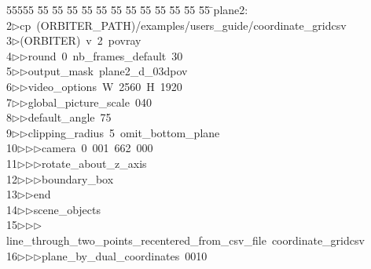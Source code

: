 %
%
\begin{tabbing}
55555 \= 55 \= 55 \= 55 \= 55 \= 55 \= 55 \= 55 \= 55 \= 55 \= 55 \= 55 \= 55 \= \>plane2:\\[0pt]
2\>$\triangleright$\>cp\ (ORBITER\_PATH)/examples/users\_guide/coordinate\_gridcsv\ \\[0pt]
3\>$\triangleright$\>(ORBITER)\ v\ 2\ povray\ \\[0pt]
4\>$\triangleright$\>$\triangleright$\>round\ 0\ nb\_frames\_default\ 30\ \\[0pt]
5\>$\triangleright$\>$\triangleright$\>output\_mask\ plane2\_d\_03dpov\ \\[0pt]
6\>$\triangleright$\>$\triangleright$\>video\_options\ W\ 2560\ H\ 1920\ \\[0pt]
7\>$\triangleright$\>$\triangleright$\>global\_picture\_scale\ 040\ \\[0pt]
8\>$\triangleright$\>$\triangleright$\>default\_angle\ 75\ \\[0pt]
9\>$\triangleright$\>$\triangleright$\>clipping\_radius\ 5\ omit\_bottom\_plane\ \ \\[0pt]
10\>$\triangleright$\>$\triangleright$\>$\triangleright$\>camera\ 0\ 001\ 662\ 000\ \ \\[0pt]
11\>$\triangleright$\>$\triangleright$\>$\triangleright$\>rotate\_about\_z\_axis\ \\[0pt]
12\>$\triangleright$\>$\triangleright$\>$\triangleright$\>boundary\_box\ \\[0pt]
13\>$\triangleright$\>$\triangleright$\>end\ \\[0pt]
14\>$\triangleright$\>$\triangleright$\>scene\_objects\ \\[0pt]
15\>$\triangleright$\>$\triangleright$\>$\triangleright$\>line\_through\_two\_points\_recentered\_from\_csv\_file\ coordinate\_gridcsv\ \\[0pt]
16\>$\triangleright$\>$\triangleright$\>$\triangleright$\>plane\_by\_dual\_coordinates\ 0010\ \\[0pt]

\end{tabbing}

